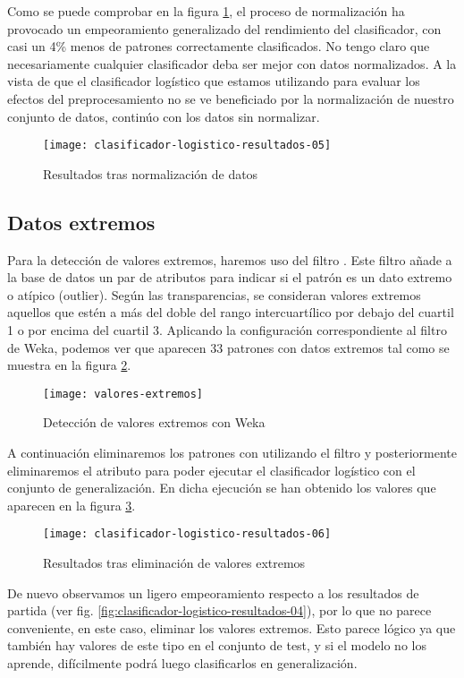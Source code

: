 Como se puede comprobar en la figura \ref{fig:clasificador-logistico-resultados-05}, el proceso de normalización ha provocado un empeoramiento generalizado del rendimiento del clasificador, con casi un 4\% menos de patrones correctamente clasificados. No tengo claro que necesariamente cualquier clasificador deba ser mejor con datos normalizados. A la vista de que el clasificador logístico que estamos utilizando para evaluar los efectos del preprocesamiento no se ve beneficiado por la normalización de nuestro conjunto de datos, continúo con los datos sin normalizar.

\begin{figure}[H]
    \centering
    \texttt{[image: clasificador-logistico-resultados-05]}
    \caption{Resultados tras normalización de datos}
    \label{fig:clasificador-logistico-resultados-05}
\end{figure}

\subsection{Datos extremos}
Para la detección de valores extremos, haremos uso del filtro . Este filtro añade a la base de datos un par de atributos para indicar si el patrón es un dato extremo o atípico (outlier). Según las transparencias, se consideran valores extremos aquellos que estén a más del doble del rango intercuartílico por debajo del cuartil 1 o por encima del cuartil 3. Aplicando la configuración correspondiente al filtro de Weka, podemos ver que aparecen 33 patrones con datos extremos tal como se muestra en la figura \ref{fig:valores-extremos}.
\begin{figure}[ht]
    \centering
    \texttt{[image: valores-extremos]}
    \caption{Detección de valores extremos con Weka}
    \label{fig:valores-extremos}
\end{figure}
A continuación eliminaremos los patrones con  utilizando el filtro  y posteriormente eliminaremos el atributo  para poder ejecutar el clasificador logístico con el conjunto de generalización. En dicha ejecución se han obtenido los valores que aparecen en la figura \ref{fig:clasificador-logistico-resultados-06}.

\begin{figure}[H]
    \centering
    \texttt{[image: clasificador-logistico-resultados-06]}
    \caption{Resultados tras eliminación de valores extremos}
    \label{fig:clasificador-logistico-resultados-06}
\end{figure}

De nuevo observamos un ligero empeoramiento respecto a los resultados de partida (ver fig. \ref{fig:clasificador-logistico-resultados-04}), por lo que no parece conveniente, en este caso, eliminar los valores extremos. Esto parece lógico ya que también hay valores de este tipo en el conjunto de test, y si el modelo no los aprende, difícilmente podrá luego clasificarlos en generalización.